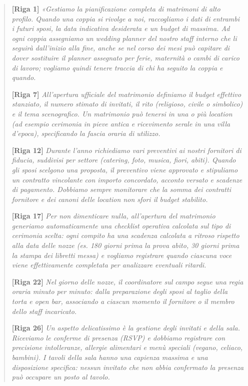 \begin{quote}
\small
\textbf{[Riga 1]} \textit{«Gestiamo la pianificazione completa di matrimoni di alto profilo. Quando una coppia si rivolge a noi, raccogliamo i dati di entrambi i futuri sposi, la data indicativa desiderata e un budget di massima. Ad ogni coppia assegniamo un wedding planner del nostro staff interno che li seguirà dall'inizio alla fine, anche se nel corso dei mesi può capitare di dover sostituire il planner assegnato per ferie, maternità o cambi di carico di lavoro; vogliamo quindi tenere traccia di chi ha seguito la coppia e quando.}

\textbf{[Riga 7]} \textit{All'apertura ufficiale del matrimonio definiamo il budget effettivo stanziato, il numero stimato di invitati, il rito (religioso, civile o simbolico) e il tema scenografico. Un matrimonio può tenersi in una o più location (ad esempio cerimonia in pieve antica e ricevimento serale in una villa d'epoca), specificando la fascia oraria di utilizzo.}

\textbf{[Riga 12]} \textit{Durante l'anno richiediamo vari preventivi ai nostri fornitori di fiducia, suddivisi per settore (catering, foto, musica, fiori, abiti). Quando gli sposi scelgono una proposta, il preventivo viene approvato e stipuliamo un contratto vincolante con importo concordato, acconto versato e scadenze di pagamento. Dobbiamo sempre monitorare che la somma dei contratti fornitore e dei canoni delle location non sfori il budget stabilito.}

\textbf{[Riga 17]} \textit{Per non dimenticare nulla, all'apertura del matrimonio generiamo automaticamente una checklist operativa calcolata sul tipo di cerimonia scelta: ogni compito ha una scadenza calcolata a ritroso rispetto alla data delle nozze (es. 180 giorni prima la prova abito, 30 giorni prima la stampa dei libretti messa) e vogliamo registrare quando ciascuna voce viene effettivamente completata per analizzare eventuali ritardi.}

\textbf{[Riga 22]} \textit{Nel giorno delle nozze, il coordinatore sul campo segue una regia oraria minuto per minuto: dalla preparazione degli sposi al taglio della torta e open bar, associando a ciascun momento il fornitore o il membro dello staff incaricato.}

\textbf{[Riga 26]} \textit{Un aspetto delicatissimo è la gestione degli invitati e della sala. Riceviamo le conferme di presenza (RSVP) e dobbiamo registrare con precisione intolleranze, allergie alimentari e menù speciali (vegano, celiaco, bambini). I tavoli della sala hanno una capienza massima e una disposizione specifica: nessun invitato che non abbia confermato la presenza può occupare un posto al tavolo.}


\end{quote}
